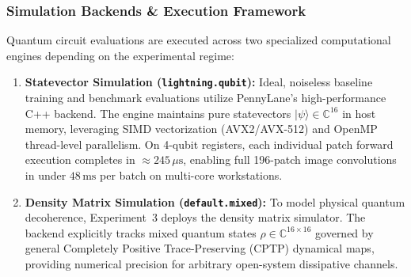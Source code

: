 \documentclass[pdflatex,sn-mathphys-num]{sn-jnl}%
\theoremstyle{thmstyleone}%
\theoremstyle{thmstyletwo}%
\theoremstyle{thmstylethree}%
\begin{document}
\subsubsection{Simulation Backends \& Execution Framework}
Quantum circuit evaluations are executed across two specialized computational engines depending on the experimental regime:
\begin{enumerate}
    \item \textbf{Statevector Simulation (\texttt{lightning.qubit}):} Ideal, noiseless baseline training and benchmark evaluations utilize PennyLane's high-performance C++ backend. The engine maintains pure statevectors $|\psi\rangle \in \mathbb{C}^{16}$ in host memory, leveraging SIMD vectorization (AVX2/AVX-512) and OpenMP thread-level parallelism. On 4-qubit registers, each individual patch forward execution completes in $\approx 245\,\mu\mathrm{s}$, enabling full 196-patch image convolutions in under $48\,\mathrm{ms}$ per batch on multi-core workstations.
    \item \textbf{Density Matrix Simulation (\texttt{default.mixed}):} To model physical quantum decoherence, Experiment~3 deploys the density matrix simulator. The backend explicitly tracks mixed quantum states $\rho \in \mathbb{C}^{16 \times 16}$ governed by general Completely Positive Trace-Preserving (CPTP) dynamical maps, providing numerical precision for arbitrary open-system dissipative channels.
\end{enumerate}
\end{document}
